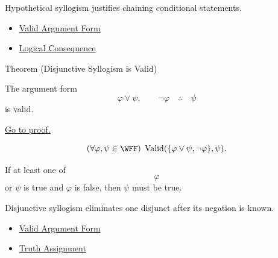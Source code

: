 \begin{remark*}[Interpretation]
Hypothetical syllogism justifies chaining conditional statements.
\end{remark*}

\begin{dependencies}
\begin{itemize}
  \item \hyperref[def:valid-argument-form-propositional-logic]{Valid Argument Form}
  \item \hyperref[def:logical-consequence-propositional-logic]{Logical Consequence}
\end{itemize}
\end{dependencies}

\begin{theorembox}{Theorem (Disjunctive Syllogism is Valid)}
\begin{theorem}
\label{thm:disjunctive-syllogism-validity-propositional-logic}
The argument form
\[
\varphi\lor\psi,\qquad \neg\varphi \quad\therefore\quad \psi
\]
is valid.

\noindent\hyperref[prf:disjunctive-syllogism-validity-propositional-logic]{Go to proof.}
\end{theorem}
\end{theorembox}

\begin{remark*}
\[
(\forall\varphi,\psi\in\WFF)\;\operatorname{Valid}(\{\varphi\lor\psi,\neg\varphi\},\psi).
\]
\end{remark*}

\begin{remark*}
If at least one of \[
  \varphi
\] or \(\psi\) is true and \(\varphi\) is false, then \(\psi\) must be true.
\end{remark*}

\begin{remark*}[Interpretation]
Disjunctive syllogism eliminates one disjunct after its negation is known.
\end{remark*}

\begin{dependencies}
\begin{itemize}
  \item \hyperref[def:valid-argument-form-propositional-logic]{Valid Argument Form}
  \item \hyperref[def:truth-assignment-propositional-logic]{Truth Assignment}
\end{itemize}
\end{dependencies}

